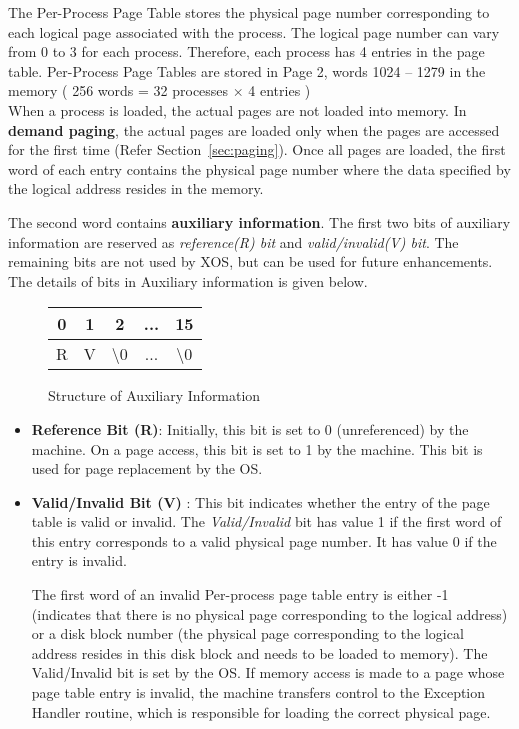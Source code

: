 \documentclass[10pt]{report}
\begin{document}
The Per-Process Page Table stores the physical page number corresponding to each logical page associated with the process. The logical page number can vary from 0 to 3 for each process.  Therefore, each process has 4 entries in the page table. Per-Process Page Tables are stored in Page 2, words 1024 -- 1279 in the memory ( 256 words = 32 processes $\times$ 4 entries )\\

When a process is loaded, the actual pages are not loaded into memory. In \textbf{demand paging}, the actual pages are loaded only when the pages are accessed for the first time (Refer Section~\ref{sec:paging}). Once all pages are loaded, the first word of each entry contains the physical page number where the data specified by the logical address resides in the memory.


The second word contains \textbf{auxiliary information}. The first two bits of auxiliary information are reserved as \textit{reference(R) bit} and \textit{valid/invalid(V) bit}. The remaining bits are not used by XOS, but can be used for future enhancements. The details of bits in Auxiliary information is given below. 

\begin{figure}
	\centering
	\begin{tabular}{|c|c|c|c|c|}
		0 & 1 & 2 & ... & 15 \\
		\hline
		R & V & \textbackslash 0 & ... & \textbackslash 0 \\
		\hline 
	\end{tabular}
	\caption{Structure of Auxiliary Information}
\end{figure}


\begin{itemize}
\item
\textbf{Reference Bit (R)}: Initially, this bit is set to 0 (unreferenced) by the machine. On a page access, this bit is set to 1 by the machine. This bit is used for page replacement by the OS. 
\item \textbf{Valid/Invalid Bit (V)} : This bit indicates whether the entry of the page table is valid or invalid. The \textit{Valid/Invalid} bit has value 1 if the first word of this entry corresponds to a valid physical page number. It has value 0 if the entry is invalid. 

The first word of an invalid Per-process page table entry is either -1 (indicates that there is no physical page corresponding to the logical address) or a disk block number (the physical page corresponding to the logical address resides in this disk block and needs to be loaded to memory). The Valid/Invalid bit is set by the OS. If memory access is made to a page whose page table entry is invalid, the machine transfers control to the Exception Handler routine, which is responsible for loading the correct physical page.
\end{itemize}
\end{document}
